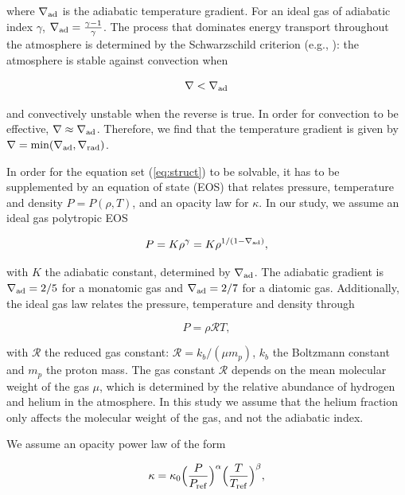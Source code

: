\documentclass[apj]{emulateapj}
\newcommand{\delad}{\nabla_{\rm ad}}
\newcommand{\delrad}{\nabla_{\rm rad}}
\begin{document}
\noindent where $\delad$ is the adiabatic temperature gradient. For an ideal gas of adiabatic index $\gamma$, $\delad=\frac{\gamma-1}{\gamma}$. The process that dominates energy transport throughout the atmosphere is determined by the Schwarzschild criterion (e.g., \citealt{thompson06}): the atmosphere is stable against convection when

\begin{equation}
\label{eq:schwarz}
\nabla < \delad
\end{equation}

\noindent and convectively unstable when the reverse is true. In order for convection to be effective, $\nabla \approx \delad$. Therefore, we find that the temperature gradient is given by $\nabla=\mathrm{min}(\delad, \delrad)$. 

In order for the equation set (\ref{eq:struct}) to be solvable, it has to be supplemented by an equation of state (EOS) that relates pressure, temperature and density $P=P(\rho, T)$, and an opacity law for $\kappa$. In our study, we assume an ideal gas polytropic EOS 

\begin{equation}
\label{eq:polyEOS}
P=K \rho^{\gamma}=K \rho^{1/(1-\delad)},
\end{equation}

\noindent with $K$ the adiabatic constant, determined by $\delad$. The adiabatic gradient is $\delad=2/5$ for a monatomic gas and $\delad=2/7$ for a diatomic gas. Additionally, the ideal gas law relates the pressure, temperature and density through

\begin{equation}
\label{eq:idealgas}
P=\rho \mathcal{R} T,
\end{equation}

\noindent with  $\mathcal{R}$ the reduced gas constant: $\mathcal{R}=k_b/(\mu m_p)$, $k_b$ the Boltzmann constant and $m_p$ the proton mass. The gas constant $\mathcal{R}$ depends on the mean molecular weight of the gas $\mu$, which is determined by the relative abundance of hydrogen and helium in the atmosphere. In this study we assume that the helium fraction only affects the molecular weight of the gas, and not the adiabatic index.%

We assume an opacity power law of the form

\begin{equation}
\label{eq:opacitylaw}
\kappa=\kappa_0 \Big(\frac{P}{P_{\rm{ref}}}\Big)^{\alpha} \Big(\frac{T}{T_{\rm{ref}}}\Big)^{\beta},
\end{equation}  
\end{document}
